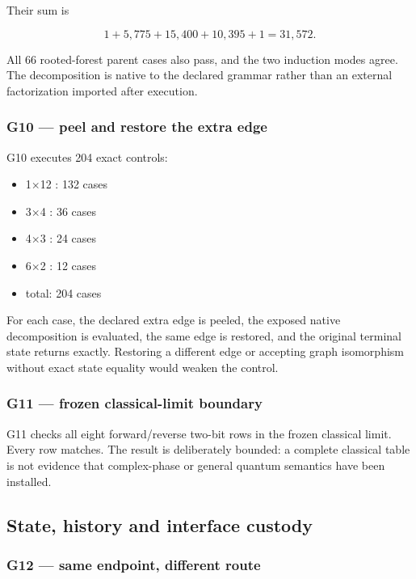 Their sum is

\[
1+5{,}775+15{,}400+10{,}395+1=31{,}572.
\]

All 66 rooted-forest parent cases also pass, and the two induction modes
agree. The decomposition is native to the declared grammar rather than
an external factorization imported after execution.

\subsubsection{G10 --- peel and restore the extra
edge}\label{viii-ch02-g10-peel-and-restore-the-extra-edge}

G10 executes 204 exact controls:

\begin{itemize}
\tightlist
\item
  1\ensuremath{\times}12 : 132 cases
\item
  3\ensuremath{\times}4 : 36 cases
\item
  4\ensuremath{\times}3 : 24 cases
\item
  6\ensuremath{\times}2 : 12 cases
\item
  total: 204 cases
\end{itemize}

For each case, the declared extra edge is peeled, the exposed native
decomposition is evaluated, the same edge is restored, and the original
terminal state returns exactly. Restoring a different edge or accepting
graph isomorphism without exact state equality would weaken the control.

\subsubsection{G11 --- frozen classical-limit
boundary}\label{viii-ch02-g11-frozen-classical-limit-boundary}

G11 checks all eight forward/reverse two-bit rows in the frozen
classical limit. Every row matches. The result is deliberately bounded:
a complete classical table is not evidence that complex-phase or general
quantum semantics have been installed.

\subsection{State, history and interface
custody}\label{viii-ch02-state-history-and-interface-custody}

\subsubsection{G12 --- same endpoint, different
route}\label{viii-ch02-g12-same-endpoint-different-route}


